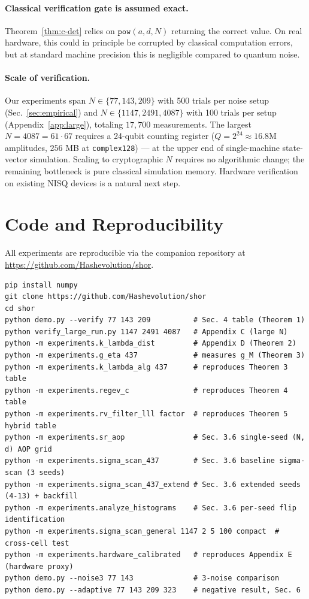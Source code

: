 \documentclass[11pt]{article}
\begin{document}
\paragraph{Classical verification gate is assumed exact.}
Theorem~\ref{thm:c-det} relies on $\texttt{pow}(a, d, N)$ returning the correct value. On real hardware, this could in principle be corrupted by classical computation errors, but at standard machine precision this is negligible compared to quantum noise.

\paragraph{Scale of verification.}
Our experiments span $N \in \{77, 143, 209\}$ with 500 trials per noise setup (Sec.~\ref{sec:empirical}) and $N \in \{1147, 2491, 4087\}$ with 100 trials per setup (Appendix~\ref{app:large}), totaling $17{,}700$ measurements. The largest $N = 4087 = 61 \cdot 67$ requires a 24-qubit counting register ($Q = 2^{24} \approx 16.8\text{M}$ amplitudes, $256$ MB at \texttt{complex128}) --- at the upper end of single-machine state-vector simulation. Scaling to cryptographic $N$ requires no algorithmic change; the remaining bottleneck is pure classical simulation memory. Hardware verification on existing NISQ devices is a natural next step.

\section{Code and Reproducibility}
\label{sec:code}

All experiments are reproducible via the companion repository at\\
\url{https://github.com/Hashevolution/shor}.

\begin{lstlisting}[style=pseudostyle]
pip install numpy
git clone https://github.com/Hashevolution/shor
cd shor
python demo.py --verify 77 143 209          # Sec. 4 table (Theorem 1)
python verify_large_run.py 1147 2491 4087   # Appendix C (large N)
python -m experiments.k_lambda_dist         # Appendix D (Theorem 2)
python -m experiments.g_eta 437             # measures g_M (Theorem 3)
python -m experiments.k_lambda_alg 437      # reproduces Theorem 3 table
python -m experiments.regev_c               # reproduces Theorem 4 table
python -m experiments.rv_filter_lll factor  # reproduces Theorem 5 hybrid table
python -m experiments.sr_aop                # Sec. 3.6 single-seed (N, d) AOP grid
python -m experiments.sigma_scan_437        # Sec. 3.6 baseline sigma-scan (3 seeds)
python -m experiments.sigma_scan_437_extend # Sec. 3.6 extended seeds (4-13) + backfill
python -m experiments.analyze_histograms    # Sec. 3.6 per-seed flip identification
python -m experiments.sigma_scan_general 1147 2 5 100 compact  # cross-cell test
python -m experiments.hardware_calibrated   # reproduces Appendix E (hardware proxy)
python demo.py --noise3 77 143              # 3-noise comparison
python demo.py --adaptive 77 143 209 323    # negative result, Sec. 6
\end{lstlisting}
\end{document}
